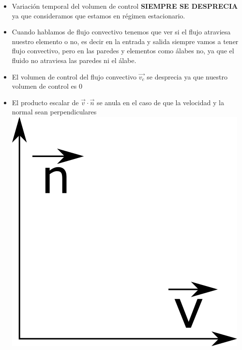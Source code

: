 \documentclass[10pt,a4paper]{article}
\begin{document}
\begin{itemize}
    \item Variación temporal del volumen de control \textbf{SIEMPRE SE DESPRECIA} ya que consideramos que estamos en régimen estacionario.
    \item Cuando hablamos de flujo convectivo tenemos que ver si el flujo atraviesa nuestro elemento o no, es decir en la entrada y salida siempre vamos a tener flujo convectivo, pero en las paredes y elementos como álabes no, ya que el fluido no atraviesa las paredes ni el álabe.
    \item El volumen de control del flujo convectivo $\vec{v_c}$ se desprecia ya que nuestro volumen de control es 0
    \item El producto escalar de $\vec{v} \cdot \vec{n}$ se anula en el caso de que la velocidad y la normal sean perpendiculares \includegraphics[scale = 0.2]{path833.png}
\end{itemize}
\end{document}
